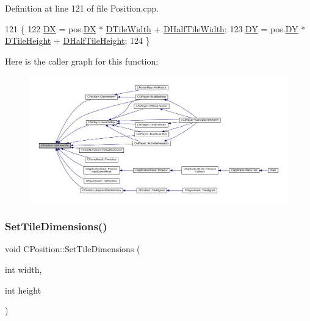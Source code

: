 Definition at line 121 of file Position.\+cpp.


\begin{DoxyCode}
121                                                \{
122     \hyperlink{classCPosition_a28445f9b872169715919074d82044eda}{DX} = pos.\hyperlink{classCPosition_a28445f9b872169715919074d82044eda}{DX} * \hyperlink{classCPosition_ac17d12fb5d35fcf62d63bb42e8cf7ed6}{DTileWidth} + \hyperlink{classCPosition_a3227e835d9008346e9d91bdad2380f14}{DHalfTileWidth};
123     \hyperlink{classCPosition_a84139c9e8eb547e7cf3cb851739943a4}{DY} = pos.\hyperlink{classCPosition_a84139c9e8eb547e7cf3cb851739943a4}{DY} * \hyperlink{classCPosition_a202ebb83e86df75cfb76cf1241ba817c}{DTileHeight} + \hyperlink{classCPosition_a1e0af68f7690b3cfc14687cf7fbe7ade}{DHalfTileHeight};
124 \}
\end{DoxyCode}
Here is the caller graph for this function\+:
\nopagebreak
\begin{figure}[H]
\begin{center}
\leavevmode
\includegraphics[width=350pt]{classCPosition_a46994e6a8b8e3b4237edd7259ad844b6_icgraph}
\end{center}
\end{figure}
\hypertarget{classCPosition_a506e9efd21e209e36533ba7e594be75f}{}\label{classCPosition_a506e9efd21e209e36533ba7e594be75f} 
\subsubsection{\texorpdfstring{Set\+Tile\+Dimensions()}{SetTileDimensions()}}
{\footnotesize\ttfamily void C\+Position\+::\+Set\+Tile\+Dimensions (\begin{DoxyParamCaption}\item[{int}]{width,  }\item[{int}]{height }\end{DoxyParamCaption})\hspace{0.3cm}{\ttfamily [static]}}



